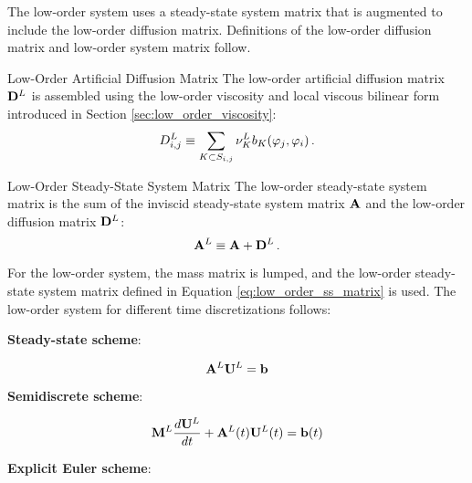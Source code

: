 The low-order system uses a steady-state system matrix that is augmented
to include the low-order diffusion matrix. Definitions of the low-order
diffusion matrix and low-order system matrix follow.
\begin{definition}{Low-Order Artificial Diffusion Matrix}
   The low-order artificial diffusion matrix $\loworderdiffusionmatrix$
   is assembled using the low-order viscosity and local viscous bilinear
   form introduced in Section \ref{sec:low_order_viscosity}:
   \begin{equation}\label{eq:low_order_diffusion_matrix}
     \diffusionmatrixletter\ij^L \equiv \sumKSij\lowordercellviscosity
     \localviscbilinearform{\cell}{j}{i} \eqp
   \end{equation}
\end{definition}
\begin{definition}{Low-Order Steady-State System Matrix}
   The low-order steady-state system matrix is the sum of the inviscid 
   steady-state system matrix $\ssmatrix$ and the low-order diffusion
   matrix $\loworderdiffusionmatrix$:
   \begin{equation}\label{eq:low_order_ss_matrix}
      \loworderssmatrix \equiv \ssmatrix + \loworderdiffusionmatrix \eqp
   \end{equation}
\end{definition}
For the low-order system, the mass matrix is lumped, and the low-order
steady-state system matrix defined in Equation \eqref{eq:low_order_ss_matrix}
is used. The low-order system for different time discretizations follows:
\begin{center}{\textbf{Steady-state scheme}:}\end{center}
\begin{equation}\label{eq:low_ss}
   \loworderssmatrix\lowordersolution = \ssrhs
\end{equation}
\begin{center}{\textbf{Semidiscrete scheme}:}\end{center}
\begin{equation}\label{eq:low_semidiscrete}
   \lumpedmassmatrix\ddt{\lowordersolution}
    + \loworderssmatrix(\timevalue)\lowordersolution(\timevalue) 
    = \ssrhs(\timevalue)
\end{equation}
\begin{center}{\textbf{Explicit Euler scheme}:}\end{center}
